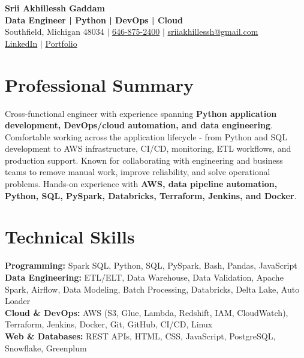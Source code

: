 \documentclass[letterpaper,10pt]{article}
\begin{document}
\fontsize{9.35pt}{10.45pt}\selectfont

\begin{center}
    {\LARGE \textbf{Srii Akhillessh Gaddam}} \\[-1pt]
    \textbf{Data Engineer | Python | DevOps | Cloud} \\[2pt]
    Southfield, Michigan 48034 $|$
    \href{tel:6468752400}{646-875-2400} $|$
    \href{mailto:sriiakhillessh@gmail.com}{sriiakhillessh@gmail.com} \\[1pt]
    \href{https://www.linkedin.com/in/srii-akhiilessh-gaddam-b48668191/}{LinkedIn} $|$
    \href{https://sriiakhillesshg.github.io/portfolio/}{Portfolio}
\end{center}
\vspace{-8pt}

\section{Professional Summary}
\small{Cross-functional engineer with experience spanning \textbf{Python application development, DevOps/cloud automation, and data engineering}. Comfortable working across the application lifecycle - from Python and SQL development to AWS infrastructure, CI/CD, monitoring, ETL workflows, and production support. Known for collaborating with engineering and business teams to remove manual work, improve reliability, and solve operational problems. Hands-on experience with \textbf{AWS, data pipeline automation, Python, SQL, PySpark, Databricks, Terraform, Jenkins, and Docker}.}

\section{Technical Skills}
\small{
\textbf{Programming:} Spark SQL, Python, SQL, PySpark, Bash, Pandas, JavaScript \\
\textbf{Data Engineering:} ETL/ELT, Data Warehouse, Data Validation, Apache Spark, Airflow, Data Modeling, Batch Processing, Databricks, Delta Lake, Auto Loader \\
\textbf{Cloud \& DevOps:} AWS (S3, Glue, Lambda, Redshift, IAM, CloudWatch), Terraform, Jenkins, Docker, Git, GitHub, CI/CD, Linux \\
\textbf{Web \& Databases:} REST APIs, HTML, CSS, JavaScript, PostgreSQL, Snowflake, Greenplum
}
\end{document}
